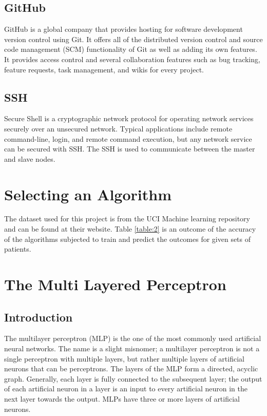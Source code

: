 \documentclass[12pt]{article}
\begin{document}
\subsection{GitHub}
GitHub is a global company that provides hosting for software development version control using Git. It offers all of the distributed version control and source code management (SCM) functionality of Git as well as adding its own features. It provides access control and several collaboration features such as bug tracking, feature requests, task management, and wikis for every project.

\subsection{SSH}
Secure Shell is a cryptographic network protocol for operating network services securely over an unsecured network. Typical applications include remote command-line, login, and remote command execution, but any network service can be secured with SSH. The SSH is used to communicate between the master and slave nodes.

\newpage
\section{Selecting an Algorithm}
The dataset used for this project is from the UCI Machine learning repository and can be found at their website. Table \ref{table:2} is an outcome of the accuracy of the algorithms subjected to train and predict the outcomes for given sets of patients. 
\newpage
\section{The Multi Layered Perceptron}
\subsection{Introduction}
The multilayer perceptron (MLP) is the one of the most commonly used artificial neural networks. The name is a slight misnomer; a multilayer perceptron is not a single perceptron with multiple layers, but rather multiple layers of artificial neurons
that can be perceptrons. The layers of the MLP form a directed, acyclic graph. Generally, each layer is fully connected to the subsequent layer; the output of each artificial neuron in a layer is an input to every artificial neuron in the next layer
towards the output. MLPs have three or more layers of artificial neurons.
\end{document}
